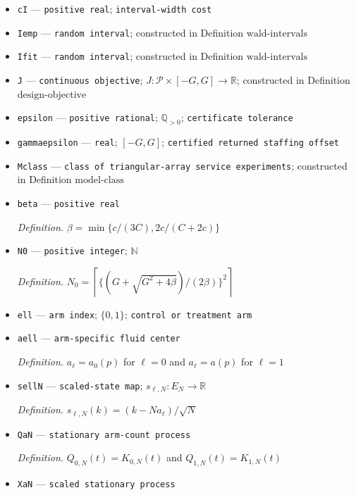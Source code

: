 \documentclass{article}
\begin{document}
\begin{itemize}
  \item \texttt{cI} --- \texttt{positive real}; \texttt{interval-\allowbreak{}width cost}
  \item \texttt{Iemp} --- \texttt{random interval}; constructed in Definition \(\mathrm{wald\mbox{-}intervals}\)
  \item \texttt{Ifit} --- \texttt{random interval}; constructed in Definition \(\mathrm{wald\mbox{-}intervals}\)
  \item \texttt{J} --- \texttt{continuous objective}; \(J:\mathcal P\times[-G,G]\to\mathbb R\); constructed in Definition \(\mathrm{design\mbox{-}objective}\)
  \item \texttt{epsilon} --- \texttt{positive rational}; \(\mathbb Q_{>0}\); \texttt{certificate tolerance}
  \item \texttt{gammaepsilon} --- \texttt{real}; \([-G,G]\); \texttt{certified returned staffing offset}
  \item \texttt{Mclass} --- \texttt{class of triangular-\allowbreak{}array service experiments}; constructed in Definition \(\mathrm{model\mbox{-}class}\)
  \item \texttt{beta} --- \texttt{positive real}
  \par\smallskip\noindent\emph{Definition.} \(\beta=\min\{c/(3C),2c/(C+2c)\}\)
  \item \texttt{N0} --- \texttt{positive integer}; \(\mathbb N\)
  \par\smallskip\noindent\emph{Definition.} \(N_0=\left\lceil\{(G+\sqrt{G^2+4\beta})/(2\beta)\}^2\right\rceil\)
  \item \texttt{ell} --- \texttt{arm index}; \(\{0,1\}\); \texttt{control or treatment arm}
  \item \texttt{aell} --- \texttt{arm-\allowbreak{}specific fluid center}
  \par\smallskip\noindent\emph{Definition.} \(a_\ell=a_0(p)\) for \(\ell=0\) and \(a_\ell=a(p)\) for \(\ell=1\)
  \item \texttt{sellN} --- \texttt{scaled-\allowbreak{}state map}; \(s_{\ell,N}:E_N\to\mathbb R\)
  \par\smallskip\noindent\emph{Definition.} \(s_{\ell,N}(k)=(k-Na_\ell)/\sqrt N\)
  \item \texttt{QaN} --- \texttt{stationary arm-\allowbreak{}count process}
  \par\smallskip\noindent\emph{Definition.} \(Q_{0,N}(t)=K_{0,N}(t)\) and \(Q_{1,N}(t)=K_{1,N}(t)\)
  \item \texttt{XaN} --- \texttt{scaled stationary process}

\end{itemize}
\end{document}
